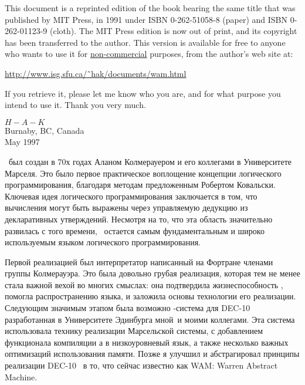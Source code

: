 \clearpage
{}

This document is a reprinted edition of the book bearing the same title that was
published by MIT Press, in 1991 under ISBN 0-262-51058-8 (paper) and ISBN
0-262-01123-9 (cloth). The MIT Press edition is now out of print, and its
copyright has been transferred to the author. This version is available for free
to anyone who wants to use it for \underline{non-commercial} purposes, from the
author’s web site at:

\medskip
\url{http://www.isg.sfu.ca/˜hak/documents/wam.html}
\medskip

\noindent
If you retrieve it, please let me know who you are, and for what purpose you
intend to use it.
Thank you very much.
\begin{flushright}
$H-A-K$\\
Burnaby, BC, Canada\\
May 1997
\end{flushright}


\prolog\ был создан в 70х годах Аланом Колмерауером и его коллегами в
Университете Марселя. Это было первое практическое воплощение концепции
логического программирования, благодаря методам предложенным Робертом Ковальски.
Ключевая идея логического программирования заключается в том, что вычисления
могут быть выражены через управляемую дедукцию из декларативных утверждений.
Несмотря на то, что эта область значительно развилась с того времени, \prolog\
остается самым фундаментальным и широко используемым языком логического
программирования.

Первой реализацией  был интерпретатор написанный на Фортране членами
группы Колмерауэра. Это была довольно грубая реализация, которая тем не менее
стала важной вехой во многих смыслах: она подтвердила жизнеспособность ,
помогла распространению языка, и заложила основы технологии его реализации.
Следующим значимым этапом была возможно \prolog-система для DEC-10 разработанная
в Университете Эдинбурга мной\note{Warren}\ и моими коллегами. Эта система
использовала технику реализации Марсельской системы, с добавлением функционала
компиляции \prolog а в низкоуровневый язык\note{ассемблер DEC-10}, а также
несколько важных оптимизаций использования памяти. Позже я улучшил и
абстрагировал принципы реализации DEC-10 \prolog\ в то, что сейчас известно как
WAM: Warren Abstract Machine.

